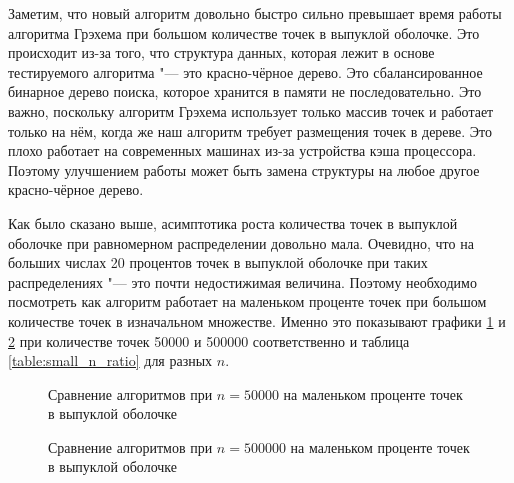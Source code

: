Заметим, что новый алгоритм довольно быстро сильно превышает время работы алгоритма Грэхема при большом количестве точек в выпуклой оболочке. Это происходит из-за того, что структура данных, которая лежит в основе тестируемого алгоритма "--- это красно-чёрное дерево. Это сбалансированное бинарное дерево поиска, которое хранится в памяти не последовательно. Это важно, поскольку алгоритм Грэхема использует только массив точек и работает только на нём, когда же наш алгоритм требует размещения точек в дереве. Это плохо работает на современных машинах из-за устройства кэша процессора. Поэтому улучшением работы может быть замена структуры на любое другое красно-чёрное дерево.

Как было сказано выше, асимптотика роста количества точек в выпуклой оболочке при равномерном распределении довольно мала. Очевидно, что на больших числах 20 процентов точек в выпуклой оболочке при таких распределениях "--- это почти недостижимая величина. Поэтому необходимо посмотреть как алгоритм работает на маленьком проценте точек при большом количестве точек в изначальном множестве. Именно это показывают графики \ref{img:comparison2_50000} и \ref{img:comparison2_500000} при количестве точек 50000 и 500000 соответственно и таблица \ref{table:small_n_ratio} для разных $n$.

\begin{figure}[hbt]
	\centering
	
	\caption{Сравнение алгоритмов при $n = 50000$ на маленьком проценте точек в выпуклой оболочке}
	\label{img:comparison2_50000}
\end{figure}

\begin{figure}
	\centering
	
	\caption{Сравнение алгоритмов при $n = 500000$ на маленьком проценте точек в выпуклой оболочке}
	\label{img:comparison2_500000}
\end{figure}

